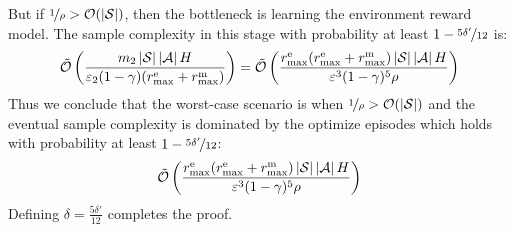 But if $\nicefrac{1}{\rho} > \mathcal{O}(\left \lvert \mathcal{S} \right \rvert)$, then the bottleneck is learning the environment reward model. The sample complexity in this stage with probability at least $1 - \nicefrac{5\delta'}{12}$ is:
%
\begin{equation*}
   \Tilde{\mathcal{O}}\left(\frac{m_2\left \lvert \mathcal{S} \right \rvert\left \lvert \mathcal{A} \right \rvert H}{\varepsilon_2 (1 - \gamma)(r_{\text{max}}^\text{e} + r_{\text{max}}^\text{m})}\right) = 
   \Tilde{\mathcal{O}}\left(\frac{r_{\text{max}}^\text{e}(r_{\text{max}}^\text{e} + r_{\text{max}}^\text{m})\left \lvert \mathcal{S} \right \rvert\left \lvert \mathcal{A} \right \rvert H}{\varepsilon^3 (1 - \gamma)^5\rho}\right)
\end{equation*}
%
Thus we conclude that the worst-case scenario is when $\nicefrac{1}{\rho} > \mathcal{O}(\left \lvert \mathcal{S} \right \rvert)$ and the eventual sample complexity is dominated by the optimize episodes which holds with probability at least $1 - \nicefrac{5\delta'}{12}$:
\begin{equation*}
       \Tilde{\mathcal{O}}\left(\frac{r_{\text{max}}^\text{e}(r_{\text{max}}^\text{e} + r_{\text{max}}^\text{m})\left \lvert \mathcal{S} \right \rvert\left \lvert \mathcal{A} \right \rvert H}{\varepsilon^3 (1 - \gamma)^5\rho}\right)
\end{equation*}
%
Defining $\delta = \frac{5\delta'}{12}$ completes the proof. \qedsymbol

